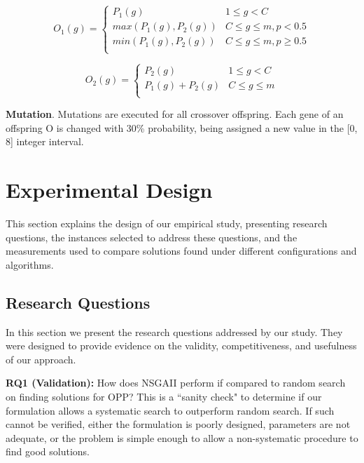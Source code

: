 \documentclass[conference]{IEEEtran}
\begin{document}
\setlength\abovedisplayskip{0pt}
\setlength\belowdisplayshortskip{0pt}
\begin{small}
\begin{equation}
O_{1}(g)=
\left \{
\begin{array}{ll}
P_{1}(g) & 1\leq g < C \\
max(P_{1}(g), P_{2}(g)) & C\leq g\leq m,p < 0.5 \\
min(P_{1}(g), P_{2}(g)) & C\leq g\leq m,p \geq 0.5 \\
\end{array}
\right.
\end{equation}

\setlength\abovedisplayshortskip{0pt}
\setlength\belowdisplayshortskip{0pt}
\small
\begin{equation}
O_{2}(g)=
\left \{
\begin{array}{ll}
P_{2}(g)& 1\leq g < C \\
P_{1}(g)+P_{2}(g) & C\leq g\leq m\\
\end{array}
\right.
\end{equation}
\end{small}

\noindent
\textbf{Mutation}. Mutations are executed for all crossover offspring. Each gene of an offspring O is changed with 30\% probability, being assigned a new value in the [0, 8] integer interval.

\section{Experimental Design}
This section explains the design of our empirical study, presenting research questions, the instances selected to address these questions, and the measurements used to compare solutions found under different configurations and algorithms.
\subsection{Research Questions}

In this section we present the research questions addressed by our study. They were designed to provide evidence on the validity, competitiveness, and usefulness of our approach.

\vspace{3px}
\noindent
\textbf{RQ1 (Validation):} How does NSGAII perform if compared to random search on finding solutions for OPP? This is a ``sanity check" to determine if our formulation allows a systematic search to outperform random search. If such cannot be verified, either the formulation is poorly designed, parameters are not adequate, or the problem is simple enough to allow a non-systematic procedure to find good solutions.
\end{document}
